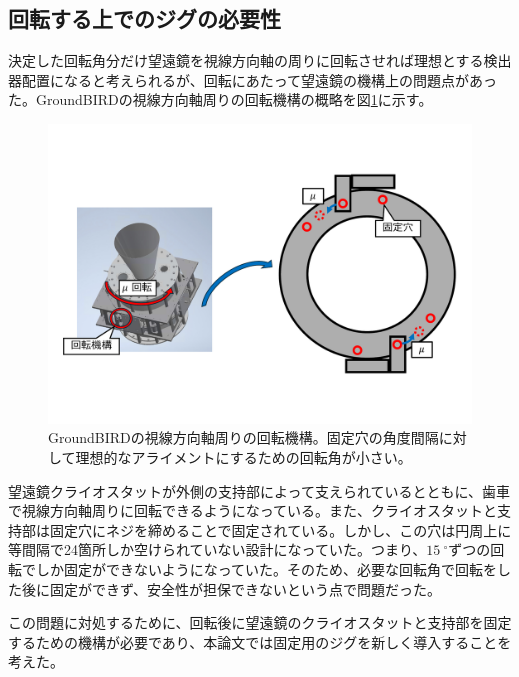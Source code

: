 \subsection{回転する上でのジグの必要性}
決定した回転角分だけ望遠鏡を視線方向軸の周りに回転させれば理想とする検出器配置になると考えられるが、回転にあたって望遠鏡の機構上の問題点があった。GroundBIRDの視線方向軸周りの回転機構の概略を図\ref{gb_fixing_system}に示す。
\begin{figure}[htbp]
  \centering
  \includegraphics[width=0.95\columnwidth]{5_alignment/figs/gb_fixing_system.pdf}
  \caption{GroundBIRDの視線方向軸周りの回転機構。固定穴の角度間隔に対して理想的なアライメントにするための回転角が小さい。}
  \label{gb_fixing_system}
\end{figure}
望遠鏡クライオスタットが外側の支持部によって支えられているとともに、歯車で視線方向軸周りに回転できるようになっている。また、クライオスタットと支持部は固定穴にネジを締めることで固定されている。しかし、この穴は円周上に等間隔で24箇所しか空けられていない設計になっていた。つまり、$\SI{15}{^{\circ}}$ずつの回転でしか固定ができないようになっていた。そのため、必要な回転角で回転をした後に固定ができず、安全性が担保できないという点で問題だった。

この問題に対処するために、回転後に望遠鏡のクライオスタットと支持部を固定するための機構が必要であり、本論文では固定用のジグを新しく導入することを考えた。

